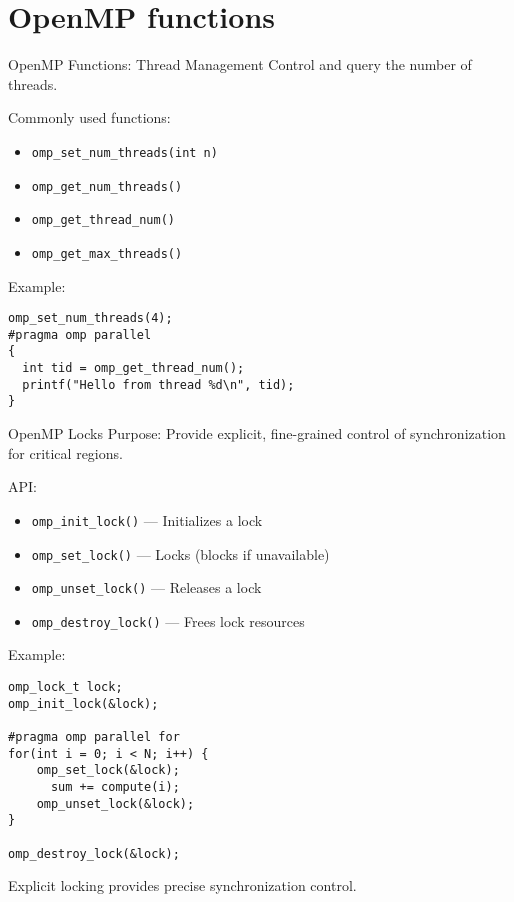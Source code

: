 \documentclass{beamer}
\begin{document}
\section{OpenMP functions}
\begin{frame}[fragile]{OpenMP Functions: Thread Management}
  Control and query the number of threads.

  Commonly used functions:
  \begin{itemize}
    \item \texttt{omp\_set\_num\_threads(int n)}
    \item \texttt{omp\_get\_num\_threads()}
    \item \texttt{omp\_get\_thread\_num()}
    \item \texttt{omp\_get\_max\_threads()}
  \end{itemize}

  Example:
  \lstset{style=CStyle}
  \begin{lstlisting}
omp_set_num_threads(4);
#pragma omp parallel
{
  int tid = omp_get_thread_num();
  printf("Hello from thread %d\n", tid);
}
  \end{lstlisting}
\end{frame}

\begin{frame}[fragile]{OpenMP Locks}
  Purpose:
  Provide explicit, fine-grained control of synchronization for critical regions.

  API:
  \begin{itemize}
    \item \texttt{omp\_init\_lock()} — Initializes a lock
    \item \texttt{omp\_set\_lock()} — Locks (blocks if unavailable)
    \item \texttt{omp\_unset\_lock()} — Releases a lock
    \item \texttt{omp\_destroy\_lock()} — Frees lock resources
  \end{itemize}

  Example:
  \lstset{style=CStyle}
  \begin{lstlisting}
omp_lock_t lock;
omp_init_lock(&lock);

#pragma omp parallel for
for(int i = 0; i < N; i++) {
    omp_set_lock(&lock);
      sum += compute(i);
    omp_unset_lock(&lock);
}

omp_destroy_lock(&lock);
  \end{lstlisting}

  Explicit locking provides precise synchronization control.
\end{frame}
\end{document}

